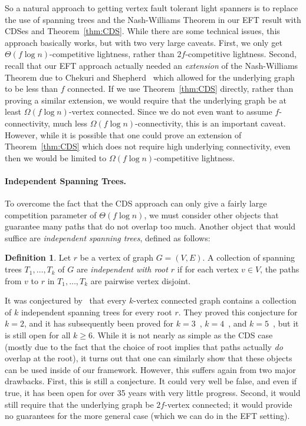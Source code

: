 \documentclass{article}
\theoremstyle{plain}
\theoremstyle{definition}
\newtheorem{definition}[theorem]{Definition}
\begin{document}
So a natural approach to getting vertex fault tolerant light spanners is to replace the use of spanning trees and the Nash-Williams Theorem in our EFT result with CDSes and Theorem~\ref{thm:CDS}.  While there are some technical issues, this approach basically works, but with two very large caveats.  First, we only get $\Theta(f \log n)$-competitive lightness, rather than $2f$-competitive lightness.  Second, recall that our EFT approach actually needed an \emph{extension} of the Nash-Williams Theorem due to Chekuri and Shepherd~\cite{chekuri2009approximate} which allowed for the underlying graph to be less than $f$ connected.  If we use Theorem~\ref{thm:CDS} directly, rather than proving a similar extension, we would require that the underlying graph be at least $\Omega(f \log n)$-vertex connected.  Since we do not even want to assume $f$-connectivity, much less $\Omega(f \log n)$-connectivity, this is an important caveat.  However, while it is possible that one could prove an extension of Theorem~\ref{thm:CDS} which does not require high underlying connectivity, even then we would be limited to $\Omega(f \log n)$-competitive lightness.

\paragraph{Independent Spanning Trees.}
To overcome the fact that the CDS approach can only give a fairly large competition parameter of $\Theta(f \log n)$, we must consider other objects that guarantee many paths that do not overlap too much. 
Another object that would suffice are \textit{independent spanning trees}, defined as follows:
\begin{definition}
    Let $r$ be a vertex of graph $G = (V,E)$. A collection of spanning trees $T_1, \dots, T_k$ of $G$ are \textit{independent with root $r$} if for each vertex $v \in V$, the paths from $v$ to $r$ in $T_1, \dots, T_k$ are pairwise vertex disjoint.
\end{definition}

It was conjectured by~\cite{IR88} that every $k$-vertex connected graph contains a collection of $k$ independent spanning trees for every root $r$.  They proved this conjecture for $k=2$, and it has subsequently been proved for $k=3$~\cite{SS19}, $k=4$~\cite{HT18}, and $k=5$~\cite{AL23}, but it is still open for all $k \geq 6$.  While it is not nearly as simple as the CDS case (mostly due to the fact that the choice of root implies that paths actually \emph{do} overlap at the root), it turns out that one can similarly show that these objects can be used inside of our framework.  However, this suffers again from two major drawbacks.  First, this is still a conjecture.  It could very well be false, and even if true, it has been open for over 35 years with very little progress.  Second, it would still require that the underlying graph be $2f$-vertex connected; it would provide no guarantees for the more general case (which we can do in the EFT setting). 
\end{document}
